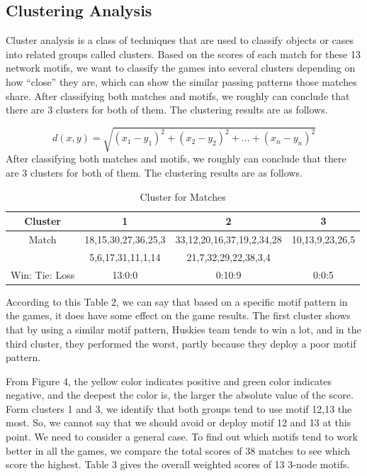 \documentclass{mcmthesis}
\begin{document}
\subsection{Clustering Analysis}
Cluster analysis is a class of techniques that are used to classify objects or cases into related groups called clusters. Based on the scores of each match for these 13 network motifs, we want to classify the games into several clusters depending on how “close” they are, which can show the similar passing patterns those matches share. After classifying both matches and motifs, we roughly can conclude that there are 3 clusters for both of them. The clustering results are as follows. 

\begin{equation}
d(x,y)=\sqrt{(x_1-y_1)^2+(x_2-y_2)^2+...+(x_n-y_n)^2}
\end{equation}
After classifying both matches and motifs, we roughly can conclude that there are 3 clusters for both of them. The clustering results are as follows.
\begin{table}[thb]
\caption{Cluster for Matches}
\begin{center}
\begin{tabular}{ c c c c}
\hline
Cluster& 1&2&3\\
\hline
Match &18,15,30,27,36,25,3&33,12,20,16,37,19,2,34,28&10,13,9,23,26,5\\
&5,6,17,31,11,1,14&21,7,32,29,22,38,3,4\\
Win: Tie: Loss&13:0:0&0:10:9&0:0:5\\
\hline
\end{tabular}
\end{center}
\end{table}

According to this Table 2, we can say that based on a specific motif pattern in the games, it does have some effect on the game results. The first cluster shows that by using a similar motif pattern, Huskies team tends to win a lot, and in the third cluster, they performed the worst, partly because they deploy a poor motif pattern. 

From Figure 4, the yellow color indicates positive and green color indicates negative, and the deepest the color is, the larger the absolute value of the score. Form clusters 1 and 3, we identify that both groups tend to use motif 12,13 the most. So, we cannot say that we should avoid or deploy motif 12 and 13 at this point. We need to consider a general case. To find out which motifs tend to work better in all the games, we compare the total scores of 38 matches to see which score the highest. Table 3 gives the overall weighted scores of 13 3-node motifs.
\end{document}
